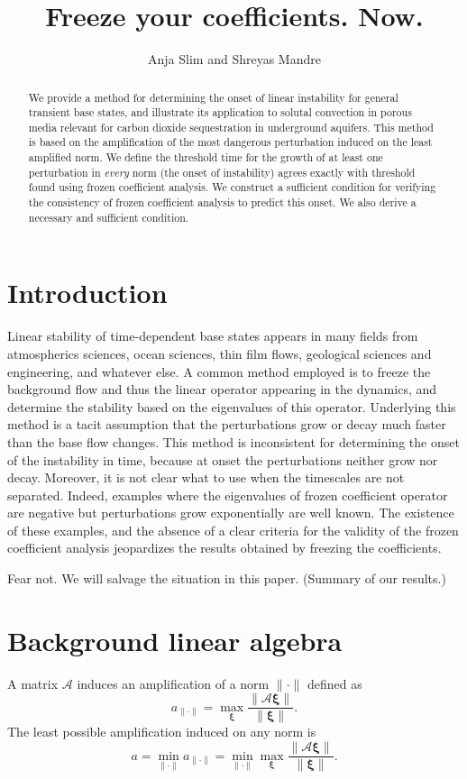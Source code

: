 \documentclass[letterpaper,10pt]{article}
\title{Freeze your coefficients. Now.}
\author{Anja Slim and Shreyas Mandre}
\newcommand{\cA}{\boldsymbol{\mathcal{A}}}
\newcommand{\prt}{\boldsymbol{\xi}}
\newcommand{\nrm}{{\|\cdot\|}}
\newcommand{\norm}[1]{{\|#1\|}}
\begin{document}
\maketitle

\begin{abstract}
We provide a method for determining the onset of linear instability for general transient base states, and illustrate its application to solutal convection in porous media relevant for carbon dioxide sequestration in underground aquifers. 
This method is based on the amplification of the most dangerous perturbation induced on the least amplified norm. 
We define the threshold time for the growth of at least one perturbation in {\em every} norm (the onset of instability) agrees exactly with threshold found using frozen coefficient analysis. 
We construct a sufficient condition for verifying the consistency of frozen coefficient analysis to predict this onset. 
We also derive a necessary and sufficient condition.
\end{abstract}
\section{Introduction}
Linear stability of time-dependent base states appears in many fields from atmospherics sciences, ocean sciences, thin film flows, geological sciences and engineering, and whatever else. 
A common method employed is to freeze the background flow and thus the linear operator appearing in the dynamics, and determine the stability based on the eigenvalues of this operator. 
Underlying this method is a tacit assumption that the perturbations grow or decay much faster than the base flow changes. 
This method is inconsistent for determining the onset of the instability in time, because at onset the perturbations neither grow nor decay.
Moreover, it is not clear what to use when the timescales are not separated.
Indeed, examples where the eigenvalues of frozen coefficient operator are negative but perturbations grow exponentially are well known. 
The existence of these examples, and the absence of a clear criteria for the validity of the frozen coefficient analysis jeopardizes the results obtained by freezing the coefficients.

Fear not. We will salvage the situation in this paper. (Summary of our results.)

\section{Background linear algebra}
A matrix $\cA$ induces an amplification of a norm $\nrm$ defined as
\begin{equation}
a_\nrm = \max_{\prt} \frac{\norm{\cA \prt}}{\norm{\prt}}.
\end{equation}
The least possible amplification induced on any norm is
\begin{equation}
a = \min_{\nrm} a_\nrm = \min_{\nrm} \max_{\prt} \frac{\norm{\cA \prt}}{\norm{\prt}}.
\end{equation}
\end{document}
